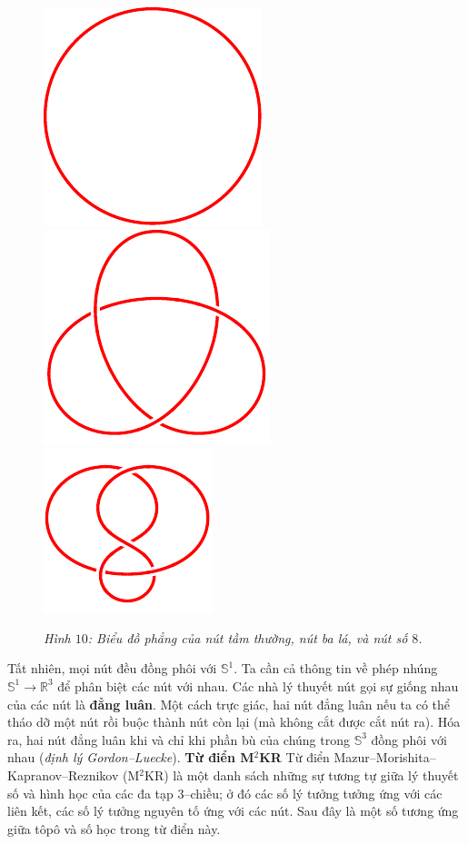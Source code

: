 \begin{multicols}{2}
	\begin{figure}[H]
		\vspace*{-5pt}
		\centering
		\captionsetup{labelformat= empty, justification=centering}
		\includegraphics[width= 0.29\linewidth]{unknot.pdf}\quad
		\includegraphics[width= 0.29\linewidth]{trefoil.pdf}\quad
		\includegraphics[width= 0.29\linewidth]{figure 8.pdf}
		\caption{\small\textit{\color{duongvaotoanhoc}Hình $10$: Biểu đồ phẳng của nút tầm thường, nút ba lá, và nút số $8$.}}
		\vspace*{-10pt}
	\end{figure}
	Tất nhiên, mọi nút đều đồng phôi với $\mathbb{S}^1$. Ta cần cả thông tin về phép nhúng $\mathbb{S}^1 \to \mathbb{R}^3$ để phân biệt các nút với nhau. Các nhà lý thuyết nút gọi sự giống nhau của các nút là {\bf\color{duongvaotoanhoc} đẳng luân}. Một cách trực giác, hai nút đẳng luân nếu ta có thể tháo dỡ một nút rồi buộc thành nút còn lại (mà không cắt được cắt nút ra). Hóa ra, hai nút đẳng luân khi và chỉ khi phần bù của chúng trong $\mathbb{S}^3$ đồng phôi với nhau ({\it định lý Gordon--Luecke}).
	\vskip 0.1cm
	\textbf{\color{duongvaotoanhoc}Từ điển M$^2$KR}
	\vskip 0.1cm
	Từ điển Mazur--Morishita--Kapranov--Reznikov (M$^2$KR) là một danh sách những sự tương tự giữa lý thuyết số và hình học của các đa tạp $3$--chiều; ở đó các số lý tưởng tưởng ứng với các liên kết, các số lý tưởng nguyên tố ứng với các nút. Sau đây là một số tương ứng giữa tôpô và số học trong từ điển này.

\end{multicols}
